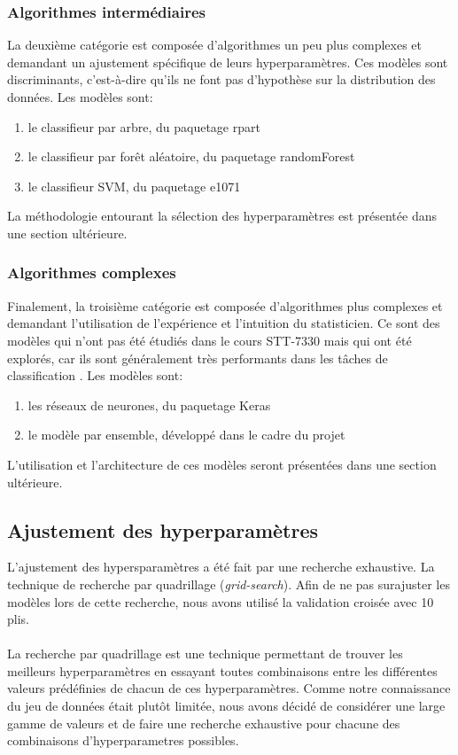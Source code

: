 \subsubsection{Algorithmes intermédiaires}
La deuxième catégorie est composée d'algorithmes un peu plus complexes et demandant un ajustement spécifique de leurs hyperparamètres. Ces modèles sont discriminants, c'est-à-dire qu'ils ne font pas d'hypothèse sur la distribution des données. Les modèles sont:

\begin{enumerate}
  \item le classifieur par arbre, du paquetage rpart \cite{packagerpart}
  \item le classifieur par forêt aléatoire, du paquetage randomForest \cite{packagerandomForest}
  \item le classifieur SVM, du paquetage e1071 \cite{packagee1071}
\end{enumerate}

La méthodologie entourant la sélection des hyperparamètres est présentée dans une section ultérieure.

\subsubsection{Algorithmes complexes}
Finalement, la troisième catégorie est composée d'algorithmes plus complexes et demandant l'utilisation de l'expérience et l'intuition du statisticien. Ce sont des modèles qui n'ont pas été étudiés dans le cours STT-7330 mais qui ont été explorés, car ils sont généralement très performants dans les tâches de classification . Les modèles sont:

\begin{enumerate}
  \item les réseaux de neurones, du paquetage Keras \cite{packagekeras}
  \item le modèle par ensemble, développé dans le cadre du projet
\end{enumerate}

L'utilisation et l'architecture de ces modèles seront présentées dans une section ultérieure.

\subsection{Ajustement des hyperparamètres}
L'ajustement des hypersparamètres a été fait par une recherche exhaustive. La technique de recherche par quadrillage (\textit{grid-search}). Afin de ne pas surajuster les modèles lors de cette recherche, nous avons utilisé la validation croisée avec 10 plis.\\ \\ 
La recherche par quadrillage est une technique permettant de trouver les meilleurs hyperparamètres en essayant toutes combinaisons entre les différentes valeurs prédéfinies de chacun de ces hyperparamètres. Comme notre connaissance du jeu de données était plutôt limitée, nous avons décidé de considérer une large gamme de valeurs et de faire une recherche exhaustive pour chacune des combinaisons d'hyperparametres possibles.

